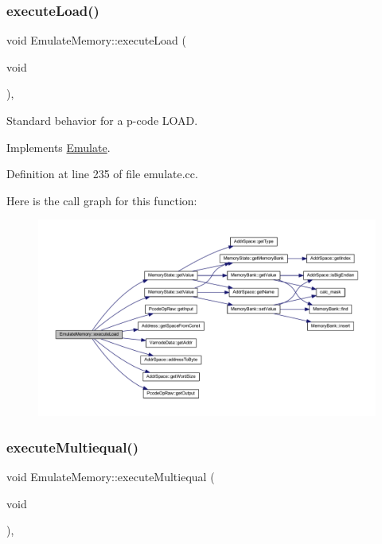\subsubsection{\texorpdfstring{executeLoad()}{executeLoad()}}
{\footnotesize\ttfamily void Emulate\+Memory\+::execute\+Load (\begin{DoxyParamCaption}\item[{void}]{ }\end{DoxyParamCaption})\hspace{0.3cm}{\ttfamily [protected]}, {\ttfamily [virtual]}}



Standard behavior for a p-\/code L\+O\+AD. 



Implements \mbox{\hyperlink{class_emulate_acc9c4d2ddbfe4ff639e320d30a212e56}{Emulate}}.



Definition at line 235 of file emulate.\+cc.

Here is the call graph for this function\+:
\nopagebreak
\begin{figure}[H]
\begin{center}
\leavevmode
\includegraphics[width=350pt]{class_emulate_memory_ad612d22e967669919fd5c8538ade212f_cgraph}
\end{center}
\end{figure}
\mbox{\label{class_emulate_memory_ae7dc193d1cdcc12ad376a1cd1505fe59}} 
\subsubsection{\texorpdfstring{executeMultiequal()}{executeMultiequal()}}
{\footnotesize\ttfamily void Emulate\+Memory\+::execute\+Multiequal (\begin{DoxyParamCaption}\item[{void}]{ }\end{DoxyParamCaption})\hspace{0.3cm}{\ttfamily [protected]}, {\ttfamily [virtual]}}



